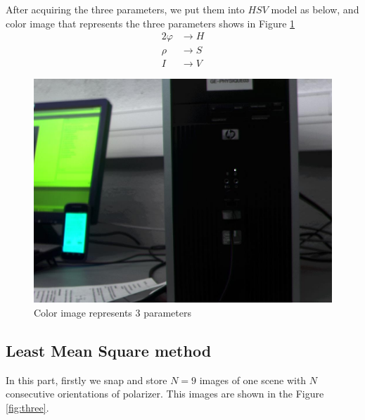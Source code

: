 \documentclass[english]{article}
\begin{document}
After acquiring the three parameters, we put them into $HSV$ model as below, and color image that represents the three parameters shows in Figure \ref{fig:hsv}\\
\begin{align*} 
	2\varphi & \rightarrow H\\
	\rho & \rightarrow S\\
	I & \rightarrow V
\end{align*}


 \begin{figure}[H]
 	\centering
	\includegraphics[width=\linewidth]{Pictures/Least_Mean/HSV2RGB.jpg}
 	\caption{Color image represents 3 parameters}
 	\label{fig:hsv}
 \end{figure}


\subsection{Least Mean Square method}
In this part, firstly we snap and store $N = 9$ images of one scene with $N$ consecutive orientations of polarizer. This images are shown in the Figure \ref{fig:three}.
\end{document}
